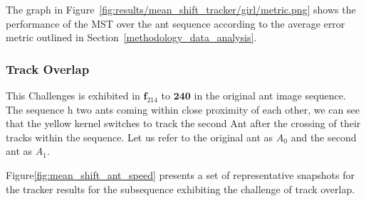 The graph in Figure~\ref{fig:results/mean_shift_tracker/girl/metric.png} shows the
performance of the MST over the ant sequence according to the average error metric outlined in
Section~\ref{methodology_data_analysis}.  



\subsubsection{Track Overlap}\label{mean_shift_track_overlap}
This Challenges is exhibited in $\mathbf{f}_{214}$ to $\mathbf{240}$ in the
original ant image sequence. The sequence h two ants coming within close proximity of
each other, we can see that the yellow kernel switches to track the second Ant
after the crossing of their tracks within the sequence. Let us refer to the
original ant as $A_0$ and the second ant as $A_1$. 

Figure\ref{fig:mean_shift_ant_speed} presents a set of representative snapshots
for the tracker results for the subsequence exhibiting the challenge of track
overlap.


